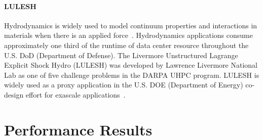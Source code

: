 \paragraph{LULESH} Hydrodynamics is widely used to model continuum properties
and interactions in materials when there is an applied
force~\cite{LLNL-TR-490254}. Hydrodynamics applications consume approximately one third
of the runtime of data center resource throughout the U.S. DoD (Department of
Defense). The Livermore Unstructured Lagrange Explicit Shock Hydro (LULESH) was
developed by Lawrence Livermore National Lab as one of five challenge problems in the DARPA UHPC program.
LULESH is widely used as a proxy application in the U.S. DOE (Department of
Energy)  co-design effort for exascale applications~\cite{LULESH}. 


 

\section{Performance Results}\label{RESULTS}

